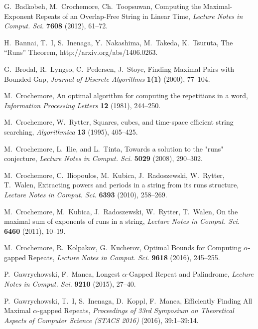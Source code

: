 \documentclass{article}
\begin{document}
\begin{thebibliography}{10}

G.~Badkobeh, M.~Crochemore, Ch.~Toopsuwan, Computing the Maximal-Exponent Repeats of an 
Overlap-Free String in Linear Time,
{\it Lecture Notes in Comput. Sci.}  {\bf 7608} (2012), 61--72.

H.~Bannai, T.~I, S.~Inenaga, Y.~Nakashima, M.~Takeda, K.~Tsuruta,
The ``Runs'' Theorem, http://arxiv.org/abs/1406.0263.

G.~Brodal, R.~Lyngso, C.~Pedersen, J.~Stoye, Finding Maximal Pairs with Bounded Gap,
{\it Journal of Discrete Algorithms}  {\bf 1(1)} (2000), 77--104.

M.~Crochemore, An optimal algorithm for computing the repetitions in a word, 
{\it Information Processing Letters} {\bf 12} (1981), 244--250.

M.~Crochemore, W.~Rytter, Squares, cubes, and time-space
efficient string searching, {\it Algorithmica} {\bf 13} (1995), 405--425. 

M.~Crochemore, L.~Ilie, and L.~Tinta, Towards a solution to the "runs" conjecture,
{\it Lecture Notes in Comput. Sci.}  {\bf 5029} (2008), 290--302.

M.~Crochemore, C.~Iliopoulos, M.~Kubica, J.~Radoszewski, W.~Rytter, T.~Walen,
Extracting powers and periods in a string from its runs structure,
{\it Lecture Notes in Comput. Sci.} {\bf 6393} (2010), 258--269.

M.~Crochemore, M.~Kubica, J.~Radoszewski, W.~Rytter, T.~Walen,
On the maximal sum of exponents of runs in a string,
{\it Lecture Notes in Comput. Sci.} {\bf 6460} (2011), 10--19.

M.~Crochemore, R.~Kolpakov, G.~Kucherov, Optimal Bounds for Computing $\alpha$-gapped 
Repeats, {\it Lecture Notes in Comput. Sci.} {\bf 9618} (2016), 245--255.

P.~Gawrychowski, F.~Manea, Longest $\alpha$-Gapped Repeat and Palindrome,
{\it Lecture Notes in Comput. Sci.} {\bf 9210} (2015), 27--40.

P.~Gawrychowski, T.~I, S.~Inenaga, D.~Koppl, F.~Manea, Efficiently Finding All Maximal 
$\alpha$-gapped Repeats, {\it Proceedings of 33rd Sym\-po\-sium on Theoretical Aspects 
of Computer Science (STACS 2016)} (2016), 39:1--39:14.


\end{thebibliography}
\end{document}
